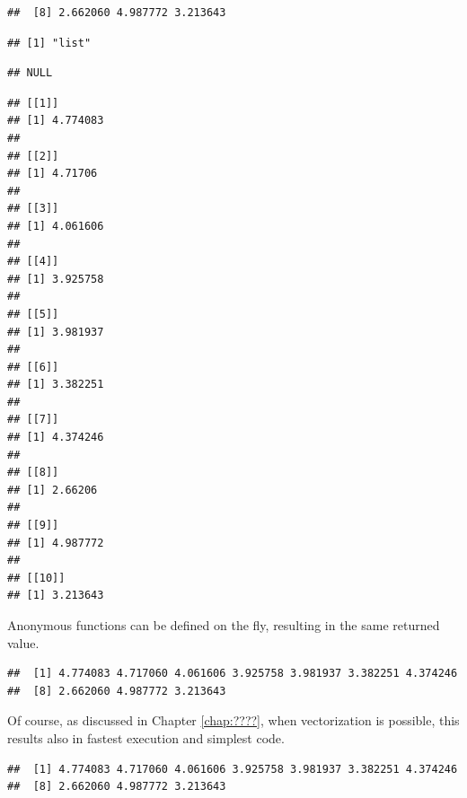 \documentclass[krantz2]{krantz}\usepackage{knitr}%
\begin{document}
\begin{knitrout}
\begin{kframe}
\begin{verbatim}
##  [8] 2.662060 4.987772 3.213643
\end{verbatim}
\begin{alltt}
 \hlkwb{<-} \hlstd{(}     \hlstd{=} \hlstd{,}  \hlstd{=} \hlstd{)}
\end{alltt}
\begin{verbatim}
## [1] "list"
\end{verbatim}
\begin{alltt}
\end{alltt}
\begin{verbatim}
## NULL
\end{verbatim}
\begin{alltt}
\end{alltt}
\begin{verbatim}
## [[1]]
## [1] 4.774083
## 
## [[2]]
## [1] 4.71706
## 
## [[3]]
## [1] 4.061606
## 
## [[4]]
## [1] 3.925758
## 
## [[5]]
## [1] 3.981937
## 
## [[6]]
## [1] 3.382251
## 
## [[7]]
## [1] 4.374246
## 
## [[8]]
## [1] 2.66206
## 
## [[9]]
## [1] 4.987772
## 
## [[10]]
## [1] 3.213643
\end{verbatim}
\end{kframe}
\end{knitrout}

Anonymous functions can be defined on the fly, resulting in the same returned value.
\begin{knitrout}\footnotesize
{}\color{fgcolor}\begin{kframe}
\begin{alltt}
\hlstd{(}   \hlstd{=} \hlstd{(}\hlstd{,} \hlstd{) \{} \hlopt{+}   \hlstd{=} \hlstd{)}
\end{alltt}
\begin{verbatim}
##  [1] 4.774083 4.717060 4.061606 3.925758 3.981937 3.382251 4.374246
##  [8] 2.662060 4.987772 3.213643
\end{verbatim}
\end{kframe}
\end{knitrout}

Of course, as discussed in Chapter \ref{chap:????}, when vectorization is possible, this results also in fastest execution and simplest code.
\begin{knitrout}\footnotesize
{}\color{fgcolor}\begin{kframe}
\begin{alltt}
 \hlopt{+} 
\end{alltt}
\begin{verbatim}
##  [1] 4.774083 4.717060 4.061606 3.925758 3.981937 3.382251 4.374246
##  [8] 2.662060 4.987772 3.213643
\end{verbatim}
\end{kframe}
\end{knitrout}
\end{document}
